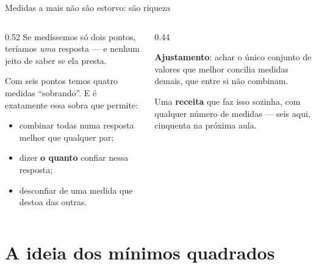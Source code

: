 \documentclass[aspectratio=169,11pt]{beamer}
\newcommand{\bnum}[1]{\textbf{\textcolor{mTeal}{#1}}}
\begin{document}
\begin{frame}{Medidas a mais não são estorvo: são riqueza}
  \begin{columns}[c]
    \begin{column}{0.52\textwidth}
      Se medíssemos só dois pontos, teríamos \emph{uma} resposta --- e
      \alert{nenhum jeito de saber se ela presta}.
      \bigskip

      Com seis pontos temos quatro medidas ``sobrando''. E é exatamente essa
      sobra que permite:
      \begin{itemize}
        \item combinar todas numa resposta melhor que qualquer par;
        \item dizer \bnum{o quanto} confiar nessa resposta;
        \item desconfiar de uma medida que destoa das outras.
      \end{itemize}
    \end{column}
    \begin{column}{0.44\textwidth}
      \begin{ideia}[title={O nome disso}]
        \textbf{Ajustamento}: achar o único conjunto de valores que melhor concilia
        medidas demais, que entre si não combinam.
      \end{ideia}
      \medskip

      \begin{ideia}[title={O que vamos construir}]
        Uma \bnum{receita} que faz isso sozinha, com qualquer número de medidas ---
        seis aqui, cinquenta na próxima aula.
      \end{ideia}
    \end{column}
  \end{columns}
\end{frame}

\section{A ideia dos mínimos quadrados}
\end{document}
